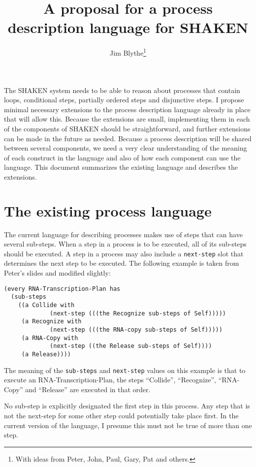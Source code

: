 \documentclass[fullpage]{article}
\begin{document}
\title{A proposal for a process description language for SHAKEN}

\author{Jim Blythe\footnote{
With ideas from Peter, John, Paul, Gary, Pat and others.}}

\maketitle

The SHAKEN system needs to be able to reason about processes that
contain loops, conditional steps, partially ordered steps and
disjunctive steps.  I propose minimal necessary extensions to the
process description language already in place that will allow this.
Because the extensions are small, implementing them in each of the
components of SHAKEN should be straightforward, and further extensions
can be made in the future as needed. Because a process description
will be shared between several components, we need a very clear
understanding of the meaning of each construct in the language and
also of how each component can use the language. This document
summarizes the existing language and describes the extensions.

\section*{The existing process language}

The current language for describing processes makes use of steps that
can have several sub-steps. When a step in a process is to be
executed, all of its sub-steps should be executed. A step in a process
may also include a {\tt next-step} slot that determines the next step
to be executed. The following example is taken from Peter's slides and
modified slightly:

{\small
\begin{verbatim}
(every RNA-Transcription-Plan has
  (sub-steps
    ((a Collide with
      	     (next-step (((the Recognize sub-steps of Self)))))
     (a Recognize with
     	     (next-step (((the RNA-copy sub-steps of Self)))))
     (a RNA-Copy with
    	     (next-step ((the Release sub-steps of Self))))
     (a Release))))
\end{verbatim}
}

The meaning of the {\tt sub-steps} and {\tt next-step} values on
this example is that to execute an RNA-Transcription-Plan, the steps
``Collide'', ``Recognize'', ``RNA-Copy'' and ``Release'' are executed
in that order.

No sub-step is explicitly designated the first step in this process.
Any step that is not the next-step for some other step could
potentially take place first. In the current version of the language,
I presume this must not be true of more than one step.
\end{document}
